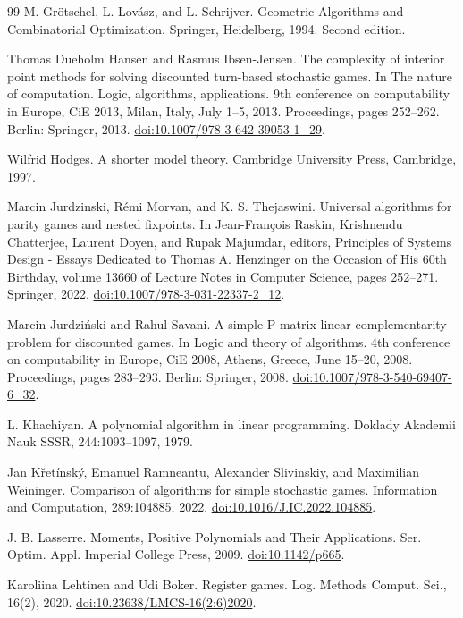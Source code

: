 \documentclass[10pt,a4paper]{article}
\theoremstyle{definition}
\begin{document}
\begin{thebibliography}{99}
 M. Grötschel, L. Lovász, and L. Schrijver. Geometric Algorithms and Combinatorial Optimization. Springer, Heidelberg, 1994. Second edition.

 Thomas Dueholm Hansen and Rasmus Ibsen-Jensen. The complexity of interior point methods for solving discounted turn-based stochastic games. In The nature of computation. Logic, algorithms, applications. 9th conference on computability in Europe, CiE 2013, Milan, Italy, July 1–5, 2013. Proceedings, pages 252–262. Berlin: Springer, 2013. \href{https://doi.org/10.1007/978-3-642-39053-1_29}{doi:10.1007/978-3-642-39053-1\_29}.

 Wilfrid Hodges. A shorter model theory. Cambridge University Press, Cambridge, 1997.

 Marcin Jurdzinski, Rémi Morvan, and K. S. Thejaswini. Universal algorithms for parity games and nested fixpoints. In Jean-François Raskin, Krishnendu Chatterjee, Laurent Doyen, and Rupak Majumdar, editors, Principles of Systems Design - Essays Dedicated to Thomas A. Henzinger on the Occasion of His 60th Birthday, volume 13660 of Lecture Notes in Computer Science, pages 252–271. Springer, 2022. \href{https://doi.org/10.1007/978-3-031-22337-2_12}{doi:10.1007/978-3-031-22337-2\_12}.

 Marcin Jurdziński and Rahul Savani. A simple P-matrix linear complementarity problem for discounted games. In Logic and theory of algorithms. 4th conference on computability in Europe, CiE 2008, Athens, Greece, June 15–20, 2008. Proceedings, pages 283–293. Berlin: Springer, 2008. \href{https://doi.org/10.1007/978-3-540-69407-6_32}{doi:10.1007/978-3-540-69407-6\_32}.

 L. Khachiyan. A polynomial algorithm in linear programming. Doklady Akademii Nauk SSSR, 244:1093–1097, 1979.

 Jan Křetínský, Emanuel Ramneantu, Alexander Slivinskiy, and Maximilian Weininger. Comparison of algorithms for simple stochastic games. Information and Computation, 289:104885, 2022. \href{https://doi.org/10.1016/J.IC.2022.104885}{doi:10.1016/J.IC.2022.104885}.

 J. B. Lasserre. Moments, Positive Polynomials and Their Applications. Ser. Optim. Appl. Imperial College Press, 2009. \href{https://doi.org/10.1142/p665}{doi:10.1142/p665}.

 Karoliina Lehtinen and Udi Boker. Register games. Log. Methods Comput. Sci., 16(2), 2020. \href{https://doi.org/10.23638/LMCS-16(2:6)2020}{doi:10.23638/LMCS-16(2:6)2020}.


\end{thebibliography}
\end{document}
